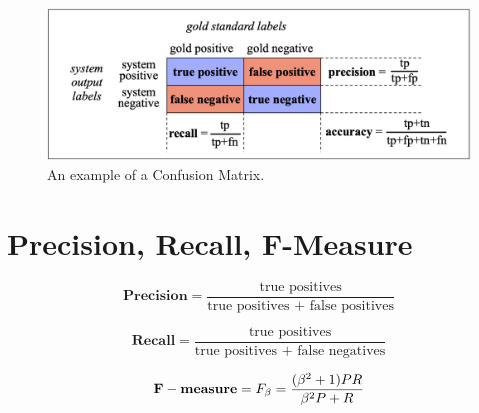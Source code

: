 \documentclass[
	number={3},
	title={Na\"iive Bayes Learning}
]{cs584notes}
\begin{document}
\begin{figure}[H]
	\centering
	\includegraphics[width=\textwidth]{figures/3/confusion_matrix}
	\caption{An example of a Confusion Matrix.}
	\label{fig:confusion-matrix}
\end{figure}


\section{Precision, Recall, F-Measure}\label{sec:precision-recall-f-measure}
\begin{equation}
	\mathbf{Precision} = \frac{\mbox{true positives}}{\mbox{true positives } + \mbox{ false positives}}
	\label{eq:precision}
\end{equation}

\begin{equation}
	\mathbf{Recall} = \frac{\mbox{true positives}}{\mbox{true positives } + \mbox{ false negatives}}
	\label{eq:recall}
\end{equation}

\begin{equation}
	\mathbf{F-measure} = F_{\beta} = \frac{(\beta^{2} + 1)PR}{\beta^{2}P + R}\\
	\label{eq:f-measure}
\end{equation}
\end{document}
